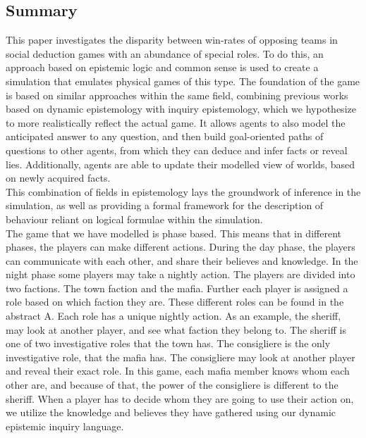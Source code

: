 \onecolumn
\begin{center}
	\section*{Summary}\label{sec:summary}
\end{center}
This paper investigates the disparity between win-rates of opposing teams in
social deduction games with an abundance of special roles. To do  this, an
approach based on epistemic logic and common sense is used to create a
simulation that emulates physical games of this type. The foundation of the
game is based on similar approaches within the same field, combining previous works based on dynamic epistemology with inquiry epistemology,
which we hypothesize to more realistically reflect the actual game. It allows agents to also model the anticipated answer to any question, and then build goal-oriented
paths of questions to other agents, from which they can deduce and infer facts or reveal lies. Additionally, agents are able to update their modelled view of worlds, based on newly acquired facts. \\
This combination of fields in epistemology lays the groundwork of inference in the simulation,
as well as providing a formal framework for the description of behaviour
reliant on logical formulae within the simulation. \\
The game that we have modelled is phase based. This means that in different phases, the players can make different actions. During the day phase, the players can communicate with each other, and share their believes and knowledge. In the night phase some players may take a nightly action. The players are divided into two factions. The town faction and the mafia. Further each player is assigned a role based on which faction they are. These different roles can be found in the abstract A. Each role has a unique nightly action. As an example, the sheriff, may look at another player, and see what faction they belong to. The sheriff is one of two investigative roles that the town has. The consigliere is the only investigative role, that the mafia has. The consigliere may look at another player and reveal their exact role. In this game, each mafia member knows whom each other are, and because of that, the power of the consigliere is different to the sheriff.
When a player has to decide whom they are going to use their action on, we utilize the knowledge and believes they have gathered using our dynamic epistemic inquiry language. \\
